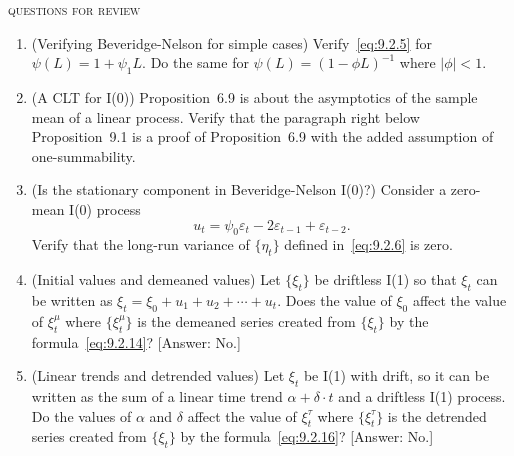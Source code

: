 \bigskip
\noindent\textsc{questions for review} \hrulefill

\begin{enumerate}
\item (Verifying Beveridge-Nelson for simple cases) \enspace Verify~\eqref{eq:9.2.5} for $\psi(L) = 1 +
\psi_1 L$. Do the same for $\psi(L) = (1 - \phi L)^{-1}$ where $|\phi| < 1$.

\item (A CLT for I(0)) \enspace Proposition~6.9 is about the asymptotics of the sample mean
of a linear process. Verify that the paragraph right below Proposition~9.1 is a
proof of Proposition~6.9 with the added assumption of one-summability.

\item (Is the stationary component in Beveridge-Nelson I(0)?) \enspace Consider a zero-mean I(0) process
\[
u_t = \psi_0 \varepsilon_t - 2\varepsilon_{t-1} + \varepsilon_{t-2}.
\]
Verify that the long-run variance of $\{\eta_t\}$ defined in~\eqref{eq:9.2.6} is zero.

\item (Initial values and demeaned values) \enspace Let $\{\xi_t\}$ be driftless I(1) so that $\xi_t$ can
be written as $\xi_t = \xi_0 + u_1 + u_2 + \cdots + u_t$. Does the value of $\xi_0$ affect the
value of $\xi_t^\mu$ where $\{\xi_t^\mu\}$ is the demeaned series created from $\{\xi_t\}$ by the formula~\eqref{eq:9.2.14}? [Answer: No.]

\item (Linear trends and detrended values) \enspace Let $\xi_t$ be I(1) with drift, so it can be
written as the sum of a linear time trend $\alpha + \delta \cdot t$ and a driftless I(1) process.
Do the values of $\alpha$ and $\delta$ affect the value of $\xi_t^\tau$ where $\{\xi_t^\tau\}$ is the detrended
series created from $\{\xi_t\}$ by the formula~\eqref{eq:9.2.16}? [Answer: No.]
\end{enumerate}
